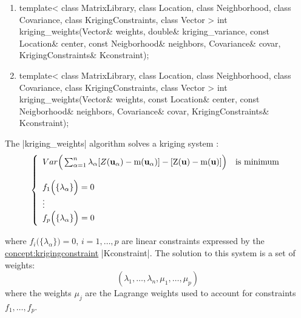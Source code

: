 \documentclass[12pt,twoside]{report}
\newcommand{\mloc}[1]{\rm{\bf #1}}
\begin{document}
\begin{enumerate}
\item 
\begin{code}
template<
         class MatrixLibrary,
         class Location,
         class Neighborhood,
         class Covariance,
         class KrigingConstraints,
         class Vector
        >
int
kriging_weights(Vector& weights, double& kriging_variance,
                const Location& center, const Neigborhood& neighbors,
                Covariance& covar, KrigingConstraints& Kconstraint);

\end{code}

\item 
\begin{code}
template<
         class MatrixLibrary,
         class Location,
         class Neighborhood,
         class Covariance,
         class KrigingConstraints,
         class Vector
        >
int
kriging_weights(Vector& weights, 
                const Location& center, const Neigborhood& neighbors,
                Covariance& covar, KrigingConstraints& Kconstraint);

\end{code}
\end{enumerate}



The |kriging_weights| algorithm solves a kriging system :
\begin{displaymath}
  \left\{ \begin{array}{l}
      Var \Big( \sum_{\alpha=1}^{n} \lambda_{\alpha} [Z(\mloc{u}_{\alpha})-m(\mloc{u}_{\alpha})] - [Z(\mloc{u})-m(\mloc{u})] \Big) \quad \textrm{is minimum} \\ \\
      f_1 \Big( \{\lambda_{\alpha} \} \Big)=0 \\
      \vdots \\
      f_p \Big( \{ \lambda_{\alpha} \} \Big)=0
    \end{array} \right.
\end{displaymath}

\noindent where $f_i \Big( \{ \lambda_{\alpha} \} \Big)=0$, $i=1,\ldots,p$ are linear constraints expressed by the \hyperref{Kriging Constraint}{Kriging Constraint}{}{concept:krigingconstraint} |Kconstraint|. The solution to this system is a set of weights: 
\begin{displaymath}
  ( \lambda_1,\ldots,\lambda_n,\mu_1,\ldots,\mu_p)
\end{displaymath}
where the weights $\mu_j$ are the Lagrange weights used to account for constraints $f_1,\ldots,f_p$.
\end{document}

